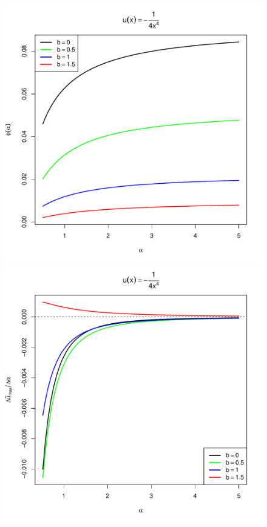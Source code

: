 \begin{subappendices}
\begin{figure}[htb!]
\begin{minipage}{0.5\linewidth}
  \end{minipage}
  \begin{minipage}{0.5\linewidth}
    \includegraphics[width=\textwidth]{phi_hat_b_t_power4.pdf}
  \end{minipage}\hfill
  \begin{minipage}{0.5\linewidth}
    \includegraphics[width=\textwidth]{U_b_t_power4.pdf}

\end{minipage}
\end{figure}
\end{subappendices}
